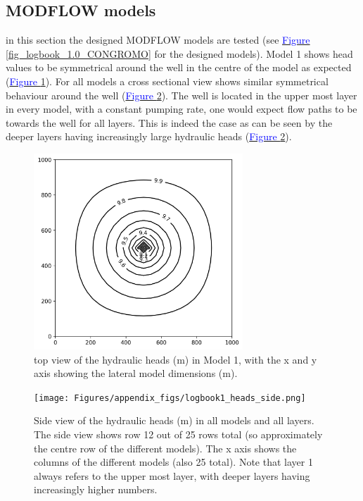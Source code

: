 \subsection{MODFLOW models}
in this section the designed MODFLOW models are tested (see \hyperref[fig_logbook_1.0_CONGROMO]{\textcolor{blue}{Figure }\ref{fig_logbook_1.0_CONGROMO}} for the designed models).  Model 1 shows head values to be symmetrical around the well in the centre of the model as expected (\hyperref[fig_logbook1_top]{\textcolor{blue}{Figure }\ref{fig_logbook1_top}}). For all models a cross sectional view shows similar symmetrical behaviour around the well (\hyperref[fig_logbook1_side]{\textcolor{blue}{Figure }\ref{fig_logbook1_side}}). The well is located in the upper most layer in every model, with a constant pumping rate, one would expect flow paths to be towards the well for all layers. This is indeed the case as can be seen by the deeper layers having increasingly large hydraulic heads (\hyperref[fig_logbook1_side]{\textcolor{blue}{Figure }\ref{fig_logbook1_side}}).

\begin{figure}[ht]
\centering
\includegraphics[width=0.7\textwidth]{Figures/appendix_figs/logbook1_heads_top.png}
\caption{top view of the hydraulic heads (m) in Model 1, with the x and y axis showing the lateral model dimensions (m).\label{fig_logbook1_top}}
\end{figure}

\begin{figure}[ht]
\centering
\texttt{[image: Figures/appendix\_figs/logbook1\_heads\_side.png]}
\caption{Side view of the hydraulic heads (m) in all models and all layers. The side view shows row 12 out of 25 rows total (so approximately the centre row of the different models). The x axis shows the columns of the different models (also 25 total). Note that layer 1 always refers to the upper most layer, with deeper layers having increasingly higher numbers.\label{fig_logbook1_side}}
\end{figure}

